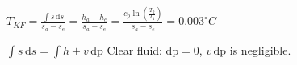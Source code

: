 \( T_{KF} = \frac{\int s \, \text{d}s}{s_a - s_e} = \frac{h_a - h_e}{s_a - s_e} = \frac{c_p \ln \left( \frac{T_2}{T_1} \right)}{s_a - s_e} = 0.003^\circ C \)  

\( \int s \, \text{d}s = \int h + v \, \text{dp} \)  
Clear fluid: \( \text{dp} = 0 \), \( v \, \text{dp} \) is negligible.